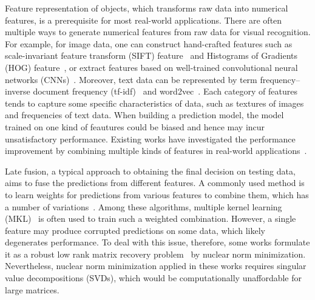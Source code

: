 \documentclass[letterpaper]{article}
\begin{document}
Feature representation of objects, which transforms raw data into numerical features, is a prerequisite for most real-world applications.
There are often multiple ways to generate numerical features from raw data for visual recognition.
For example, for image data, one can construct hand-crafted features such as scale-invariant feature transform
(SIFT) feature~\cite{loweijcv2004distinctive} and Histograms of Gradients (HOG) feature~\cite{dalalcvpr2005histograms},
or extract features based on well-trained convolutional neural networks (CNNs)~\cite{krizhevsky2012imagenet}.
Moreover, text data can be represented by term frequency–inverse document frequency (tf-idf)~\cite{manning2008introduction} and word2vec~\cite{mikoloviclr2013efficient}.
Each category of features tends to capture some specific characteristics of data,
such as textures of images and frequencies of text data.
When building a prediction model, the model trained on one kind of feautures could be biased and hence may incur unsatisfactory performance.
Existing works have investigated the performance improvement by combining multiple kinds of features in real-world applications~\cite{gehler2009feature,ye2012robust,xuiccv2013feature,lai2015learning}.


Late fusion, a typical approach to obtaining the final decision on testing data, aims to fuse the predictions from different features.
A commonly used method is to learn weights for predictions from various features to combine them, which has a number of variations~\cite{gehler2009feature,xuiccv2013feature,lai2015learning}.
Among these algorithms, multiple kernel learning (MKL)~\cite{lanckriet2004learning,Rakotomamonjy2008Simplemkl} is often used to train such a weighted combination.
However, a single feature may produce corrupted predictions on some data, which likely degenerates performance.
To deal with this issue, therefore, some works formulate it as a robust low rank matrix recovery problem~\cite{gaoijcai2016robust,ye2012robust} by nuclear norm minimization.
Nevertheless, nuclear norm minimization applied in these works requires singular value decompositions (SVDs), which would be computationally unaffordable for large matrices.
\end{document}

